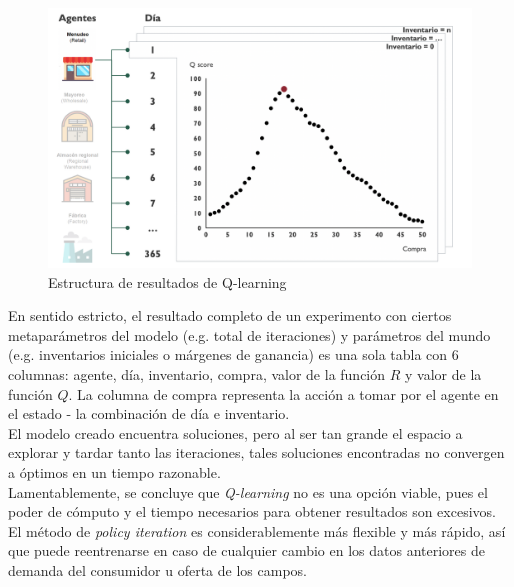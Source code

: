 \begin{figure}[H]
\caption{Estructura de resultados de Q-learning}
\label{q_learning_results}
\includegraphics[width=12cm]{tesis_tex/figs/q_learning_results.png}
\centering
\end{figure}

En sentido estricto, el resultado completo de un experimento con ciertos metapar\'ametros del modelo (e.g. total de iteraciones) y par\'ametros del mundo (e.g. inventarios iniciales o m\'argenes de ganancia) es una sola tabla con 6 columnas: agente, d\'ia, inventario, compra, valor de la funci\'on $R$ y valor de la funci\'on $Q$. La columna de compra representa la acci\'on a tomar por el agente en el estado - la combinaci\'on de d\'ia e inventario. \\

El modelo creado encuentra soluciones, pero al ser tan grande el espacio a explorar y tardar tanto las iteraciones, tales soluciones encontradas no convergen a \'optimos en un tiempo razonable.\\

Lamentablemente, se concluye que \textit{Q-learning} no es una opci\'on viable, pues el poder de c\'omputo y el tiempo necesarios para obtener resultados son excesivos. El m\'etodo de \textit{policy iteration} es considerablemente m\'as flexible y m\'as r\'apido, as\'i que puede reentrenarse en caso de cualquier cambio en los datos anteriores de demanda del consumidor u oferta de los campos.
